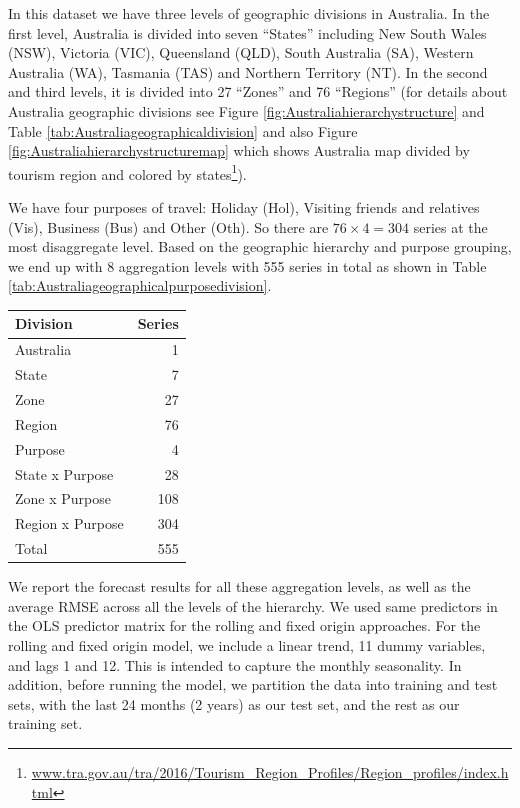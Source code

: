 \documentclass[11pt,a4paper,]{article}
\let\origtable\table
\let\endorigtable\endtable
\renewenvironment{table}[1][2] {
    \expandafter\origtable\expandafter[!htbp]
} {
    \endorigtable
}
\begin{document}
In this dataset we have three levels of geographic divisions in Australia. In the first level, Australia is divided into seven ``States'' including New South Wales (NSW), Victoria (VIC), Queensland (QLD), South Australia (SA), Western Australia (WA), Tasmania (TAS) and Northern Territory (NT). In the second and third levels, it is divided into 27 ``Zones'' and 76 ``Regions'' (for details about Australia geographic divisions see Figure \ref{fig:Australiahierarchystructure} and Table \ref{tab:Australiageographicaldivision} and also Figure \ref{fig:Australiahierarchystructuremap} which shows Australia map divided by tourism region and colored by states\footnote{\url{www.tra.gov.au/tra/2016/Tourism_Region_Profiles/Region_profiles/index.html}}).

We have four purposes of travel: Holiday (Hol), Visiting friends and relatives (Vis), Business (Bus) and Other (Oth). So there are \(76\times4 = 304\) series at the most disaggregate level. Based on the geographic hierarchy and purpose grouping, we end up with 8 aggregation levels with 555 series in total as shown in Table \ref{tab:Australiageographicalpurposedivision}.

\begin{table}[!h]

\caption{\label{tab:Australiageographicalpurposedivision}Number of Australian domestic tourism series at each aggregation level.}
\centering
\begin{tabular}[t]{lr}
\toprule
Division & Series\\
\midrule
Australia & 1\\
State & 7\\
Zone & 27\\
Region & 76\\
Purpose & 4\\
State x Purpose & 28\\
Zone x Purpose & 108\\
Region x Purpose & 304\\
\hline
Total & 555\\
\bottomrule
\end{tabular}
\end{table}

We report the forecast results for all these aggregation levels, as well as the average RMSE across all the levels of the hierarchy. We used same predictors in the OLS predictor
matrix for the rolling and fixed origin approaches. For the rolling and fixed origin model, we include a linear trend, 11 dummy variables, and lags 1 and 12. This is intended to capture the monthly seasonality. In addition, before running the model, we partition the data into training and test sets, with the last 24 months (2 years) as our test set, and the rest as our training set.
\end{document}
